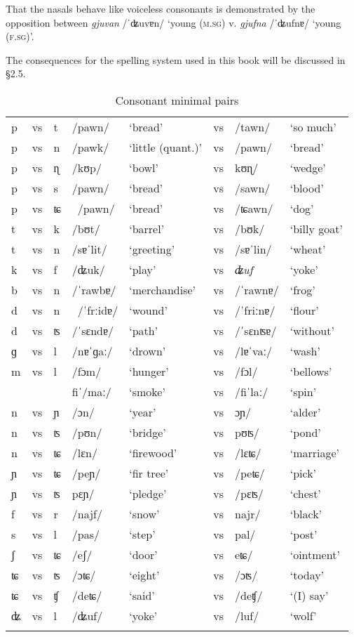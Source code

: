 That the nasals behave like voiceless consonants is demonstrated by the opposition between \textit{gjuvan} /ˈʥuvɐn/ `young (\textsc{m.sg}) v. \textit{gjufna} /ˈʥufnɐ/ `young (\textsc{f.sg})'.

The consequences for the spelling system used in this book will be discussed in §2.5.

\begin{table}
\caption{Consonant minimal pairs}
\label{cmp}
 \begin{tabular}{llllllll}
 \lsptoprule
p&vs&t& /pawn/&`bread'&vs& /tawn/ &`so much'\\
p&vs&n& /pawk/&`little (quant.)'&vs& /pawn/ &`bread' \\
p&vs&ɳ& /kʊp/&`bowl'&vs&\/kʊɳ/ & `wedge' \\
p&vs&s& /pawn/&`bread'&vs& /sawn/ & `blood' \\
p&vs&ʨ&\ /pawn/&`bread'&vs& /ʨawn/ & `dog' \\
t&vs&k&  /bʊt/&`barrel'&vs& /bʊk/ & `billy goat' \\
t&vs&n& /sɐˈlit/&`greeting'&vs& /sɐˈlin/ & `wheat' \\
k&vs&f& /ʥuk/&`play'&vs&\textit{ʥuf}&`yoke'\\
b&vs&n& /ˈrawbɐ/&`merchandise'&vs& /ˈrawnɐ/ & `frog'\\
d&vs&n&\ /ˈfrːidɐ/&`wound'&vs&/ˈfriːnɐ/ & `flour'\\
d&vs&ʦ& /ˈsɛndɐ/&`path'&vs& /ˈsɛnʦɐ/ & `without'\\
ɡ & vs & l & /nɐˈɡaː/ & `drown' & vs & /lɐˈvaː/ & `wash'\\
m&vs&l& /fɔm/ & `hunger' & vs & /fɔl/ & `bellows'\\
&&& fiˈ/maː/& `smoke' & vs& /fiˈlaː/& `spin'\\
n&vs&ɲ& /ɔn/&`year'&vs&\/ɔɲ/ &`alder'\\
n&vs&ʦ& /pʊn/&`bridge'&vs&\/pʊʦ/&`pond'\\
n&vs&ʨ& /lɛn/&`firewood'&vs&/lɛʨ/&`marriage'\\
ɲ&vs&ʨ&/peɲ/&`fir tree'&vs&/peʨ/ & `pick'\\
ɲ&vs&ʦ& pɛɲ/&`pledge'&vs&/pɛʦ/&`chest'\\
f&vs&r&  /najf/ &`snow'&vs&\/najr/ &`black'\\
s&vs&l&  /pas/&`step'&vs&\/pal/&`post'\\
ʃ&vs&ʨ& /eʃ/&`door'&vs &\/eʨ/&`ointment'\\
ʨ&vs&ʦ& /ɔʨ/&`eight'&vs&/ɔʦ/&`today'\\
ʨ&vs&ʧ& /deʨ/&`said'&vs&/deʧ/&`(I) say'\\
ʥ&vs&l& /ʥuf/&`yoke'&vs&/luf/ & `wolf'\\
  \lspbottomrule
 \end{tabular}
\end{table}

